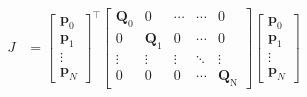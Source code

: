 \documentclass[conference]{IEEEtran}
\begin{document}
    \begin{equation}
        \begin{aligned}
            J 
            &= 
            \begin{bmatrix}\boldsymbol p_0\\\boldsymbol p_1\\\vdots\\\boldsymbol p_ N\end{bmatrix}^\top
            \begin{bmatrix}\boldsymbol Q_0&0&\cdots&\cdots&0\\0&\boldsymbol Q_1&0&\cdots&0\\\vdots&\vdots&\vdots&\ddots&\vdots\\0&0&0&\cdots&\boldsymbol Q_\mathrm N\end{bmatrix}
            \begin{bmatrix}\boldsymbol p_0\\\boldsymbol p_1\\\vdots\\\boldsymbol p_ N\end{bmatrix}

\end{aligned}
\end{equation}
\end{document}
